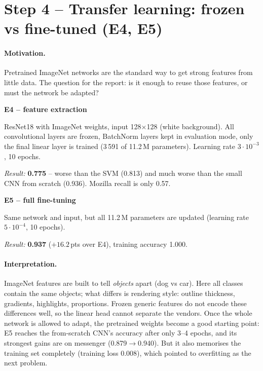 \documentclass[11pt,a4paper]{article}
\newcommand{\pt}{\,pts}
\newenvironment{stepbox}[1]{\par\medskip\noindent\textbf{#1}\par\nopagebreak}{\par}
\begin{document}
\section{Step 4 -- Transfer learning: frozen vs fine-tuned (E4, E5)}

\paragraph{Motivation.} Pretrained ImageNet networks are the standard way to get strong features
from little data. The question for the report: is it enough to reuse those features, or must the
network be adapted?

\begin{stepbox}{E4 -- feature extraction}
ResNet18 with ImageNet weights, input 128$\times$128 (white background). All convolutional layers are
frozen, BatchNorm layers kept in evaluation mode, only the final linear layer is trained (3\,591 of
11.2\,M parameters). Learning rate $3\cdot10^{-3}$, 10 epochs.
\end{stepbox}
\noindent\emph{Result:} \textbf{0.775} -- worse than the SVM (0.813) and much worse than the small CNN
from scratch (0.936). Mozilla recall is only 0.57.

\begin{stepbox}{E5 -- full fine-tuning}
Same network and input, but all 11.2\,M parameters are updated (learning rate $5\cdot10^{-4}$, 10 epochs).
\end{stepbox}
\noindent\emph{Result:} \textbf{0.937} ($+16.2$\pt{} over E4), training accuracy 1.000.

\paragraph{Interpretation.} ImageNet features are built to tell \emph{objects} apart (dog vs car). Here
all classes contain the same objects; what differs is rendering style: outline thickness,
gradients, highlights, proportions. Frozen generic features do not encode these differences well,
so the linear head cannot separate the vendors. Once the whole network is allowed to adapt, the
pretrained weights become a good starting point: E5 reaches the from-scratch CNN's accuracy after
only 3--4 epochs, and its strongest gains are on messenger (0.879$\to$0.940). But it also memorises the
training set completely (training loss 0.008), which pointed to overfitting as the next problem.
\end{document}
